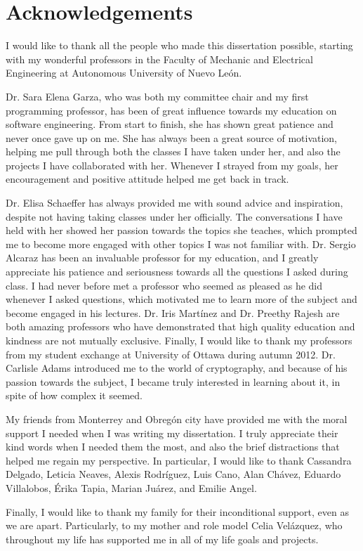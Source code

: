 \chapter*{Acknowledgements}

I would like to thank all the people who made this dissertation possible, starting with my wonderful professors in the Faculty of Mechanic and Electrical Engineering at Autonomous University of Nuevo Le\'{o}n. 

Dr. Sara Elena Garza, who was both my committee chair and my first programming professor, has been of great influence towards my education on software engineering. From start to finish, she has shown great patience and never once gave up on me. She has always been a great source of motivation, helping me pull through both the classes I have taken under her, and also the projects I have collaborated with her. Whenever I strayed from my goals, her encouragement and positive attitude helped me get back in track. 

Dr. Elisa Schaeffer has always provided me with sound advice and inspiration, despite not having taking classes under her officially. The conversations I have held with her showed her passion towards the topics she teaches, which prompted me to become more engaged with other topics I was not familiar with. Dr. Sergio Alcaraz has been an invaluable professor for my education, and I greatly appreciate his patience and seriousness towards all the questions I asked during class. I had never before met a professor who seemed as pleased as he did whenever I asked questions, which motivated me to learn more of the subject and become engaged in his lectures. Dr. Iris Mart\'{i}nez and Dr. Preethy Rajesh are both amazing professors who have demonstrated that high quality education and kindness are not mutually exclusive. Finally, I would like to thank my professors from my student exchange at University of Ottawa during autumn 2012. Dr. Carlisle Adams introduced me to the world of cryptography, and because of his passion towards the subject, I became truly interested in learning about it, in spite of how complex it seemed.

My friends from Monterrey and Obreg\'{o}n city have provided me with the moral support I needed when I was writing my dissertation. I truly appreciate their kind words when I needed them the most, and also the brief distractions that helped me regain my perspective. In particular, I would like to thank Cassandra Delgado, Leticia Neaves, Alexis Rodr\'{i}guez, Luis Cano, Alan Ch\'{a}vez, Eduardo Villalobos, \'{E}rika Tapia, Marian Ju\'{a}rez, and Emilie Angel.

Finally, I would like to thank my family for their inconditional support, even as we are apart. Particularly, to my mother and role model Celia Vel\'{a}zquez, who throughout my life has supported me in all of my life goals and projects. 

\newpage
